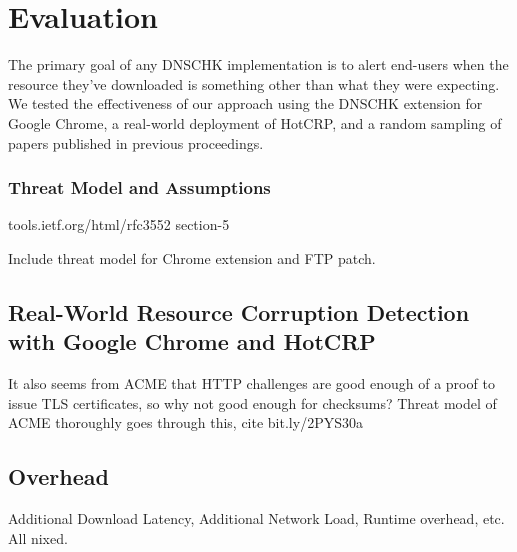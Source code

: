 \section{Evaluation} \label{sec:evaluation}

The primary goal of any DNSCHK implementation is to alert end-users when the
resource they've downloaded is something other than what they were expecting. We
tested the effectiveness of our approach using the DNSCHK extension for Google
Chrome, a real-world deployment of HotCRP, and a random sampling of papers
published in previous \CONFERENCE{} proceedings.

\subsubsection{Threat Model and Assumptions}

tools.ietf.org/html/rfc3552 section-5

Include threat model for Chrome extension and FTP patch.

\subsection{Real-World Resource Corruption Detection with Google Chrome and HotCRP}

It also seems from ACME that HTTP challenges are good enough of a proof to issue
TLS certificates, so why not good enough for checksums? Threat model of ACME
thoroughly goes through this, cite bit.ly/2PYS30a

\subsection{Overhead}

Additional Download Latency, Additional Network Load, Runtime overhead, etc. All
nixed.
